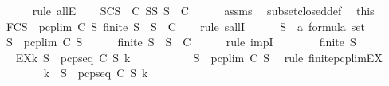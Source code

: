 \begin{isabellebody}
\ \ \ \ \isamarkupfalse%
\ {\isacharparenleft}rule\ allE{\isacharparenright}\isanewline
\ \ \isamarkupfalse%
\ SC{\isacharcolon}{\isachardoublequoteopen}{\isasymforall}S\ {\isasymin}\ C{\isachardot}\ {\isasymforall}S{\isacharprime}{\isasymsubseteq}S{\isachardot}\ S{\isacharprime}\ {\isasymin}\ C{\isachardoublequoteclose}\isanewline
\ \ \ \ \isamarkupfalse%
\ assms{\isacharparenleft}{}{\isacharparenright}\ \isamarkupfalse%
\ subset{\isacharunderscore}closed{\isacharunderscore}def\ \isamarkupfalse%
\ this\isanewline
\ \ \isamarkupfalse%
\ FC{}{\isacharcolon}{\isachardoublequoteopen}{\isasymforall}S{\isacharprime}\ {\isasymsubseteq}\ pcp{\isacharunderscore}lim\ C\ S{\isachardot}\ finite\ S{\isacharprime}\ {\isasymlongrightarrow}\ S{\isacharprime}\ {\isasymin}\ C{\isachardoublequoteclose}\isanewline
\ \ \isamarkupfalse%
\ {\isacharparenleft}rule\ sallI{\isacharparenright}\isanewline
\ \ \ \ \isamarkupfalse%
\ S{\isacharprime}\ {\isacharcolon}{\isacharcolon}\ {\isachardoublequoteopen}{\isacharprime}a\ formula\ set{\isachardoublequoteclose}\isanewline
\ \ \ \ \isamarkupfalse%
\ {\isachardoublequoteopen}S{\isacharprime}\ {\isasymsubseteq}\ pcp{\isacharunderscore}lim\ C\ S{\isachardoublequoteclose}\isanewline
\ \ \ \ \isamarkupfalse%
\ {\isachardoublequoteopen}finite\ S{\isacharprime}\ {\isasymlongrightarrow}\ S{\isacharprime}\ {\isasymin}\ C{\isachardoublequoteclose}\isanewline
\ \ \ \ \isamarkupfalse%
\ {\isacharparenleft}rule\ impI{\isacharparenright}\isanewline
\ \ \ \ \ \ \isamarkupfalse%
\ {\isachardoublequoteopen}finite\ S{\isacharprime}{\isachardoublequoteclose}\isanewline
\ \ \ \ \ \ \isamarkupfalse%
\ \isamarkupfalse%
\ EX{\isacharcolon}{\isachardoublequoteopen}{\isasymexists}k{\isachardot}\ S{\isacharprime}\ {\isasymsubseteq}\ pcp{\isacharunderscore}seq\ C\ S\ k{\isachardoublequoteclose}\ \isanewline
\ \ \ \ \ \ \ \ \isamarkupfalse%
\ {\isacartoucheopen}S{\isacharprime}\ {\isasymsubseteq}\ pcp{\isacharunderscore}lim\ C\ S{\isacartoucheclose}\ \isamarkupfalse%
\ {\isacharparenleft}rule\ finite{\isacharunderscore}pcp{\isacharunderscore}lim{\isacharunderscore}EX{\isacharparenright}\isanewline
\ \ \ \ \ \ \isamarkupfalse%
\ k\ \ {\isachardoublequoteopen}S{\isacharprime}\ {\isasymsubseteq}\ pcp{\isacharunderscore}seq\ C\ S\ k{\isachardoublequoteclose}\isanewline

\end{isabellebody}
